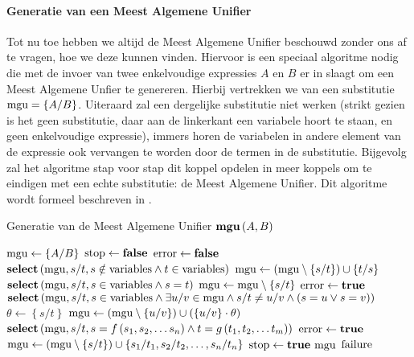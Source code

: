 \paragraph{Generatie van een Meest Algemene Unifier}
Tot nu toe hebben we altijd de Meest Algemene Unifier beschouwd zonder ons af te vragen, hoe we deze kunnen vinden. Hiervoor is een speciaal algoritme nodig die met de invoer van twee enkelvoudige expressies $A$ en $B$ er in slaagt om een Meest Algemene Unfier te genereren. Hierbij vertrekken we van een substitutie $\mbox{mgu}=\left\{A/B\right\}$. Uiteraard zal een dergelijke substitutie niet werken (strikt gezien is het geen substitutie, daar aan de linkerkant een variabele hoort te staan, en geen enkelvoudige expressie), immers horen de variabelen in andere element van de expressie ook vervangen te worden door de termen in de substitutie. Bijgevolg zal het algoritme stap voor stap dit koppel opdelen in meer koppels om te eindigen met een echte substitutie: de Meest Algemene Unifier. Dit algoritme wordt formeel beschreven in .
\begin{algorithm}[htb]
\caption{Generatie van de Meest Algemene Unifier $\mbox{\bf mgu}\left( A,B \right)$}
\label{alg:genesisMgu}
\begin{algorithmic}[1]
\STATE $\mbox{mgu}\leftarrow\left\{A/B\right\}$
\STATE $\mbox{stop}\leftarrow\mbox{\bf false}$
\STATE $\mbox{error}\leftarrow\mbox{\bf false}$
\WHILE{$\neg\stopt\wedge\neg\errort$}
\STATE $\mbox{\bf select}\left( \mbox{mgu},s/t,s\notin\mbox{variables}\wedge t\in\mbox{variables} \right)$
\STATE $\mbox{mgu}\leftarrow\left(\mbox{mgu}\setminus\left\{s/t\right\}\right)\cup\left\{t/s\right\}$
\STATE $\mbox{\bf select}\left( \mbox{mgu},s/t,s\in\mbox{variables}\wedge s=t \right)$
\STATE $\mbox{mgu}\leftarrow\mbox{mgu}\setminus\left\{s/t\right\}$
\STATE $\mbox{error}\leftarrow\mbox{\bf true}$
\STATE $\mbox{\bf select}\left( \mbox{mgu},s/t,s\in\mbox{variables}\wedge\exists u/v\in\mbox{mgu}\wedge s/t\neq u/v\wedge \left(s=u\vee s=v\right) \right)$
\STATE $\theta\leftarrow\left\{s/t\right\}$
\STATE $\mbox{mgu}\leftarrow\left(\mbox{mgu}\setminus\left\{u/v\right\}\right)\cup\left(\left\{u/v\right\}\cdot\theta\right)$
\ENDIF
\ENDFOR
{}
\STATE $\mbox{\bf select}\left( \mbox{mgu},s/t,s=f\left(s_1,s_2,\ldots s_n\right)\wedge t=g\left(t_1,t_2,\ldots t_m\right) \right)$
\STATE $\mbox{error}\leftarrow\mbox{\bf true}$
\ELSE
\STATE $\mbox{mgu}\leftarrow\left(\mbox{mgu}\setminus\left\{s/t\right\}\right)\cup\left\{s_1/t_1,s_2/t_2,\ldots,s_n/t_n\right\}$
\ENDIF
\ELSE
\STATE $\mbox{stop}\leftarrow\mbox{\bf true}$
\ENDIF
\ENDWHILE
\IF{$\neg\errort$}
\RETURN $\mbox{mgu}$
\ELSE
\RETURN $\mbox{failure}$
\ENDIF
\end{algorithmic}
\end{algorithm}

